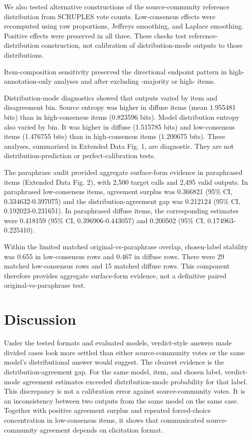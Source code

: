 \documentclass[11pt]{article}
\begin{document}
We also tested alternative constructions of the source-community reference distribution from SCRUPLES vote counts. Low-consensus effects were recomputed using raw proportions, Jeffreys smoothing, and Laplace smoothing. Positive effects were preserved in all three. These checks test reference-distribution construction, not calibration of distribution-mode outputs to those distributions.

Item-composition sensitivity preserved the directional endpoint pattern in high-annotation-only analyses and after excluding -majority or high- items.

Distribution-mode diagnostics showed that outputs varied by item and disagreement bin. Source entropy was higher in diffuse items (mean 1.955481 bits) than in high-consensus items (0.823596 bits). Model distribution entropy also varied by bin. It was higher in diffuse (1.515785 bits) and low-consensus items (1.476755 bits) than in high-consensus items (1.200675 bits). These analyses, summarized in Extended Data Fig. 1, are diagnostic. They are not distribution-prediction or perfect-calibration tests.

The paraphrase audit provided aggregate surface-form evidence in paraphrased items (Extended Data Fig. 2), with 2,500 target calls and 2,495 valid outputs. In paraphrased low-consensus items, agreement surplus was 0.366821 (95\% CI, 0.334632-0.397075) and the distribution-agreement gap was 0.212124 (95\% CI, 0.192023-0.231651). In paraphrased diffuse items, the corresponding estimates were 0.418159 (95\% CI, 0.396906-0.443057) and 0.200502 (95\% CI, 0.174963-0.225410).

Within the limited matched original-vs-paraphrase overlap, chosen-label stability was 0.655 in low-consensus rows and 0.467 in diffuse rows. There were 29 matched low-consensus rows and 15 matched diffuse rows. This component therefore provides aggregate surface-form evidence, not a definitive paired original-vs-paraphrase test.


\section{Discussion}

Under the tested formats and evaluated models, verdict-style answers made divided cases look more settled than either source-community votes or the same model's distributional answer would suggest. The clearest evidence is the distribution-agreement gap. For the same model, item, and chosen label, verdict-mode agreement estimates exceeded distribution-mode probability for that label. This discrepancy is not a calibration error against source-community votes. It is an inconsistency between two outputs from the same model on the same case. Together with positive agreement surplus and repeated forced-choice concentration in low-consensus items, it shows that communicated source-community agreement depends on elicitation format.
\end{document}
